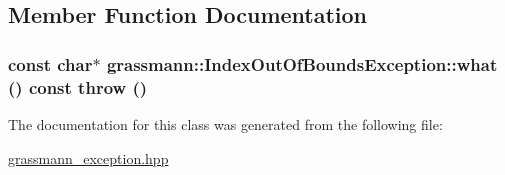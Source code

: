 \subsection{Member Function Documentation}
\hypertarget{classgrassmann_1_1IndexOutOfBoundsException_f81e056b32b7cae21a5fd7232ee7b9c8}{
\subsubsection[what]{\setlength{\rightskip}{0pt plus 5cm}const char$\ast$ grassmann::IndexOutOfBoundsException::what () const  throw ()}}
\label{classgrassmann_1_1IndexOutOfBoundsException_f81e056b32b7cae21a5fd7232ee7b9c8}




The documentation for this class was generated from the following file:\begin{CompactItemize}
\item 
\hyperlink{grassmann__exception_8hpp}{grassmann\_\-exception.hpp}\end{CompactItemize}
